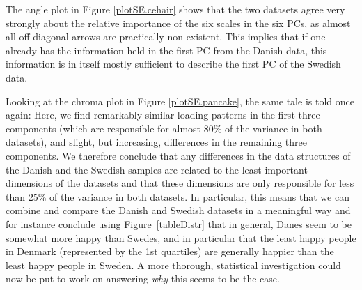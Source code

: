\documentclass[]{interact}
\theoremstyle{plain}%
\theoremstyle{definition}
\theoremstyle{remark}
\begin{document}

The angle plot in Figure \ref{plotSE.cehair} shows that the two datasets agree very strongly about the relative importance of the six scales in the six PCs, as almost all off-diagonal arrows are practically non-existent. This implies that if one already has the information held in the first PC from the Danish data, this information is in itself mostly sufficient to describe the first PC of the Swedish data.

Looking at the chroma plot in Figure \ref{plotSE.pancake}, the same tale is told once again: Here, we find remarkably similar loading patterns in the first three components (which are responsible for almost 80\% of the variance in both datasets), and slight, but increasing, differences in the remaining three components. We therefore conclude that any differences in the data structures of the Danish and the Swedish samples are related to the least important dimensions of the datasets and that these dimensions are only responsible for less than 25\% of the variance in both datasets. In particular, this means that we can combine and compare the Danish and Swedish datasets in a meaningful way and for instance conclude using Figure~\ref{tableDistr} that in general, Danes seem to be somewhat more happy than Swedes, and in particular that the least happy people in Denmark (represented by the 1st quartiles) are generally happier than the least happy people in Sweden. A more thorough, statistical investigation could now be put to work on answering \textit{why} this seems to be the case.

\end{document}
